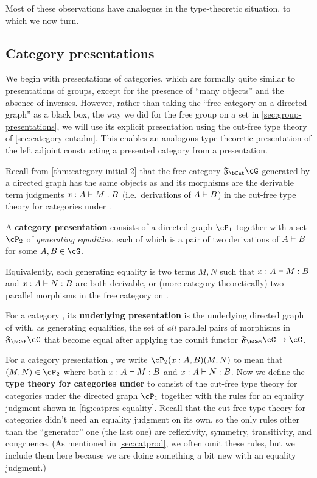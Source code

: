 Most of these observations have analogues in the type-theoretic situation, to which we now turn.


\subsection{Category presentations}
\label{sec:category-presentations}

We begin with presentations of categories, which are formally quite similar to presentations of groups, except for the presence of ``many objects'' and the absence of inverses.
However, rather than taking the ``free category on a directed graph'' as a black box, the way we did for the free group on a set in \cref{sec:group-presentations}, we will use its explicit presentation using the cut-free type theory of \cref{sec:category-cutadm}.
This enables an analogous type-theoretic presentation of the left adjoint constructing a presented category from a presentation.

Recall from \cref{thm:category-initial-2} that the free category $\F\bCat\cG$ generated by a directed graph \cG has the same objects as \cG and its morphisms are the derivable term judgments $x:A\vdash M:B$ (i.e.\ derivations of $A\vdash B$) in the cut-free type theory for categories under \cG.

\begin{defn}
  A \textbf{category presentation} \cP consists of a directed graph $\cP_1$ together with a set $\cP_2$ of \emph{generating equalities}, each of which is a pair of two derivations of $A\vdash B$ for some $A,B\in\cG$.
\end{defn}

Equivalently, each generating equality is two terms $M,N$ such that $x:A\vdash M:B$ and $x:A\vdash N:B$ are both derivable, or (more category-theoretically) two parallel morphisms in the free category on \cG.

\begin{defn}
  For a category \cC, its \textbf{underlying presentation} is the underlying directed graph of \cC with, as generating equalities, the set of \emph{all} parallel pairs of morphisms in $\F\bCat\cC$ that become equal after applying the counit functor $\F\bCat\cC \to \cC$.
\end{defn}

For a category presentation \cP, we write $\cP_2(x:A,B)(M,N)$ to mean that $(M,N)\in\cP_2$ where both $x:A\vdash M:B$ and $x:A\vdash N:B$.
Now we define the \textbf{type theory for categories under \cP} to consist of the cut-free type theory for categories under the directed graph $\cP_1$ together with the rules for an equality judgment shown in \cref{fig:catpres-equality}.
Recall that the cut-free type theory for categories didn't need an equality judgment on its own, so the only rules other than the ``generator'' one (the last one) are reflexivity, symmetry, transitivity, and congruence.
(As mentioned in \cref{sec:catprod}, we often omit these rules, but we include them here because we are doing something a bit new with an equality judgment.)

